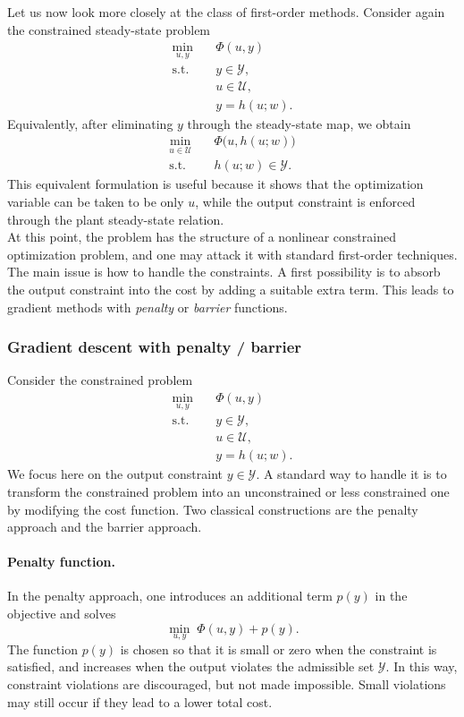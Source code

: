 Let us now look more closely at the class of first-order methods. Consider again the constrained steady-state problem
\[
\begin{aligned}
\min_{u,y}\quad & \Phi(u,y)\\
\text{s.t.}\quad & y \in \mathcal Y,\\
& u \in \mathcal U,\\
& y = h(u;w).
\end{aligned}
\]
Equivalently, after eliminating $y$ through the steady-state map, we obtain
\[
\begin{aligned}
\min_{u \in \mathcal U}\quad & \Phi\bigl(u,h(u;w)\bigr)\\
\text{s.t.}\quad & h(u;w) \in \mathcal Y.
\end{aligned}
\]
This equivalent formulation is useful because it shows that the optimization variable can be taken to be only $u$, while the output constraint is enforced through the plant steady-state relation.\\

At this point, the problem has the structure of a nonlinear constrained optimization problem, and one may attack it with standard first-order techniques. The main issue is how to handle the constraints. A first possibility is to absorb the output constraint into the cost by adding a suitable extra term. This leads to gradient methods with \emph{penalty} or \emph{barrier} functions.

\subsubsection{Gradient descent with penalty / barrier}

Consider the constrained problem
\[
\begin{aligned}
\min_{u,y}\quad & \Phi(u,y)\\
\text{s.t.}\quad & y \in \mathcal Y,\\
& u \in \mathcal U,\\
& y = h(u;w).
\end{aligned}
\]
We focus here on the output constraint $y \in \mathcal Y$. A standard way to handle it is to transform the constrained problem into an unconstrained or less constrained one by modifying the cost function. Two classical constructions are the penalty approach and the barrier approach.

\paragraph{Penalty function.}
In the penalty approach, one introduces an additional term $p(y)$ in the objective and solves
\[
\min_{u,y} \; \Phi(u,y) + p(y).
\]
The function $p(y)$ is chosen so that it is small or zero when the constraint is satisfied, and increases when the output violates the admissible set $\mathcal Y$. In this way, constraint violations are discouraged, but not made impossible. Small violations may still occur if they lead to a lower total cost.\\

